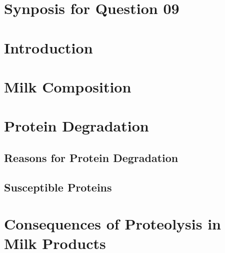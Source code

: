 \setcounter{chapter}{2}
\setcounter{section}{0}
\section*{Synposis for Question 09}

\section{Introduction}



\section{Milk Composition}


\section{Protein Degradation}

\subsection{Reasons for Protein Degradation}


\subsection{Susceptible Proteins}


\section{Consequences of Proteolysis in Milk Products}





